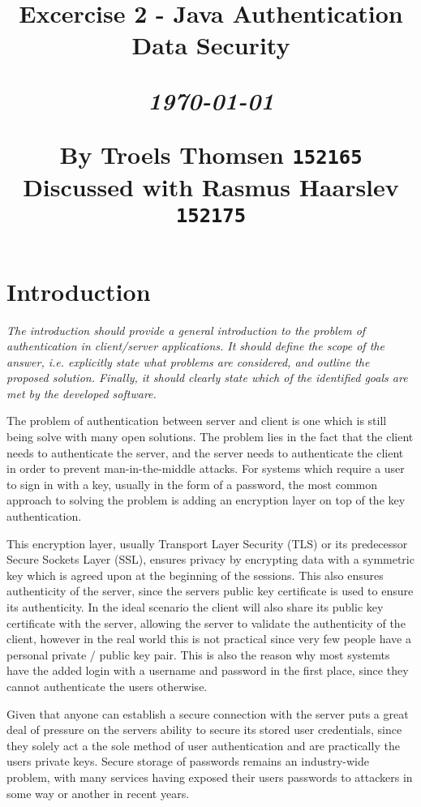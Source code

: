 \documentclass[12pt]{article}
\title{
  \vspace{4cm}
  \begin{flushleft}
  \Large{\textbf{Excercise 2 - Java Authentication}} \\
  \large{Data Security} \\
  \end{flushleft}
  \vspace{0cm}
  \begin{flushleft}
  \small
  \textit{\today}
  \end{flushleft}
  \vspace{12cm}
  \begin{flushleft}
  \small
  By Troels Thomsen \texttt{152165}\\
  Discussed with Rasmus Haarslev \texttt{152175}
  \end{flushleft}
}
\date{
}
\begin{document}
\clearpage
{}
\thispagestyle{empty}
\maketitle

\newpage

\tableofcontents

\newpage


\section{Introduction}
\label{sec:Introduction (1 page)}

\textit{The introduction should provide a general introduction to the problem of authentication in client/server applications. It should define the scope of the answer, i.e. explicitly state what problems are considered, and outline the proposed solution. Finally, it should clearly state which of the identified goals are met by the developed software.}

The problem of authentication between server and client is one which is still being solve with many open solutions. The problem lies in the fact that the client needs to authenticate the server, and the server needs to authenticate the client in order to prevent man-in-the-middle attacks. For systems which require a user to sign in with a key, usually in the form of a password, the most common approach to solving the problem is adding an encryption layer on top of the key authentication.

This encryption layer, usually Transport Layer Security (TLS) or its predecessor Secure Sockets Layer (SSL), ensures privacy by encrypting data with a symmetric key which is agreed upon at the beginning of the sessions. This also ensures authenticity of the server, since the servers public key certificate is used to ensure its authenticity. In the ideal scenario the client will also share its public key certificate with the server, allowing the server to validate the authenticity of the client, however in the real world this is not practical since very few people have a personal private / public key pair. This is also the reason why most systemts have the added login with a username and password in the first place, since they cannot authenticate the users otherwise.

Given that anyone can establish a secure connection with the server puts a great deal of pressure on the servers ability to secure its stored user credentials, since they solely act a the sole method of user authentication and are practically the users private keys. Secure storage of passwords remains an industry-wide problem, with many services having exposed their users passwords to attackers in some way or another in recent years.
\end{document}
